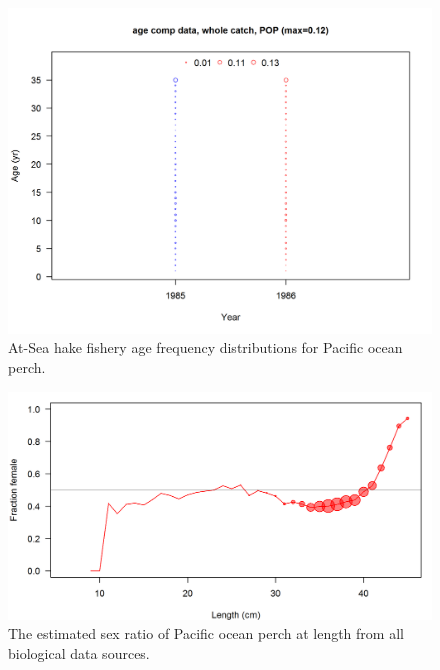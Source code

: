 \documentclass[12pt,]{article}
\begin{document}
\FloatBarrier

\begin{figure}
\centering
\includegraphics{r4ss/plots_mod1/comp_agedat_bubflt2mkt0.png}
\caption{At-Sea hake fishery age frequency distributions for Pacific
ocean perch. \label{fig:ASHOP_Age}}
\end{figure}

\FloatBarrier

\begin{figure}
\centering
\includegraphics{Figures/allSexRatios.png}
\caption{The estimated sex ratio of Pacific ocean perch at length from
all biological data sources. \label{fig:sexratio}}
\end{figure}
\end{document}
